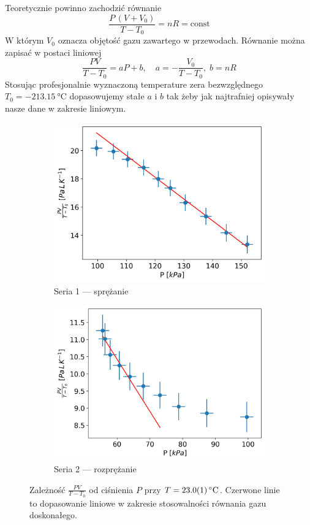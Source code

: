 \documentclass[12pt]{article}
\begin{document}
Teoretycznie powinno zachodzić równanie
\[
  \frac{P\,(V+V_0)}{T - T_0} = nR = \text{const}
\]
W którym $V_0$ oznacza objętość gazu zawartego w przewodach.
Równanie można zapisać w postaci liniowej
\[
  \frac{PV}{T - T_0} = aP + b, \quad a = -\frac{V_0}{T - T_0}, \; b = nR
\]
Stosując profesjonalnie wyznaczoną temperature zera bezwzględnego \(T_0 = \SI{-213.15}{\celsius}\) dopasowujemy stałe $a$ i $b$ tak żeby jak najtrafniej opisywały nasze dane w zakresie liniowym.
\begin{figure}[H]
  \centering
  \begin{subfigure}{0.47\textwidth}
    \includegraphics[width=\linewidth]{izotermic_0}
    \caption{Seria 1 — sprężanie}
  \end{subfigure}\hfill
  \begin{subfigure}{0.47\textwidth}
    \includegraphics[width=\linewidth]{izotermic_1}
    \caption{Seria 2 — rozprężanie}
  \end{subfigure}
  \caption{Zależność $\tfrac{PV}{T - T_0}$ od ciśnienia $P$ przy $T = \SI{23.0\pm0.1}{\celsius}$. Czerwone linie to dopasowanie liniowe w zakresie stosowalności równania gazu doskonałego.}
  \label{fig:isothermal}
\end{figure}
\end{document}
